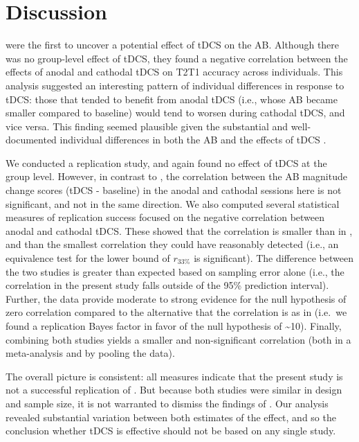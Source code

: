 \documentclass[11pt,english,]{memoir}
\begin{document}
\hypertarget{AB_tDCS-discussion}{%
\section{Discussion}\label{AB_tDCS-discussion}}

\textcite{London2015} were the first to uncover a potential effect of tDCS on the AB. Although there was no group-level effect of tDCS, they found a negative correlation between the effects of anodal and cathodal tDCS on T2\textbar{}T1 accuracy across individuals. This analysis suggested an interesting pattern of individual differences in response to tDCS: those that tended to benefit from anodal tDCS (i.e., whose AB became smaller compared to baseline) would tend to worsen during cathodal tDCS, and vice versa. This finding seemed plausible given the substantial and well-documented individual differences in both the AB \autocite{Willems2016} and the effects of tDCS \autocite{Krause2014}.

We conducted a replication study, and again found no effect of tDCS at the group level. However, in contrast to \textcite{London2015}, the correlation between the AB magnitude change scores (tDCS - baseline) in the anodal and cathodal sessions here is not significant, and not in the same direction. We also computed several statistical measures of replication success focused on the negative correlation between anodal and cathodal tDCS. These showed that the correlation is smaller than in \textcite{London2015}, and than the smallest correlation they could have reasonably detected (i.e., an equivalence test for the lower bound of \(r_{33\%}\) \autocite{Simonsohn2015} is significant). The difference between the two studies is greater than expected based on sampling error alone (i.e., the correlation in the present study falls outside of the 95\% prediction interval). Further, the data provide moderate to strong evidence for the null hypothesis of zero correlation compared to the alternative that the correlation is as in \textcite{London2015} (i.e.~we found a replication Bayes factor in favor of the null hypothesis of \textasciitilde{}10). Finally, combining both studies yields a smaller and non-significant correlation (both in a meta-analysis and by pooling the data).

The overall picture is consistent: all measures indicate that the present study is not a successful replication of \textcite{London2015}. But because both studies were similar in design and sample size, it is not warranted to dismiss the findings of \textcite{London2015}. Our analysis revealed substantial variation between both estimates of the effect, and so the conclusion whether tDCS is effective should not be based on any single study.
\end{document}
